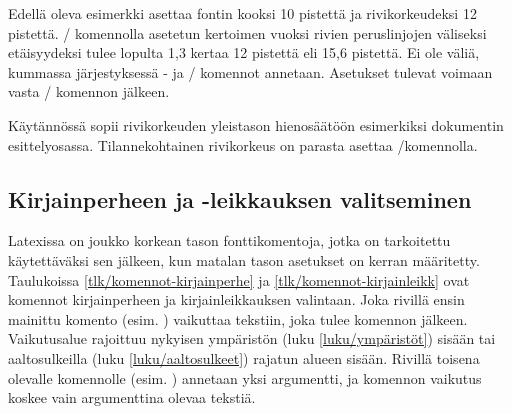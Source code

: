 \noindent
Edellä oleva esimerkki asettaa fontin kooksi 10 pistettä ja
rivikorkeudeksi 12 pistettä. \-/ komennolla asetetun
kertoimen vuoksi rivien peruslinjojen väliseksi etäisyydeksi tulee
lopulta 1,3 kertaa 12 pistettä eli 15,6 pistettä. Ei ole väliä, kummassa
järjestyksessä - ja \-/ komennot
annetaan. Asetukset tulevat voimaan vasta \-/
komennon jälkeen.

Käytännössä  sopii rivikorkeuden yleistason
hienosäätöön esimerkiksi dokumentin esittelyosassa. Tilannekohtainen
rivikorkeus on parasta asettaa \-/komennolla.

\subsection{Kirjainperheen ja -leikkauksen valitseminen}
\label{luku/fontit-korkea}

Latexissa on joukko korkean tason fonttikomentoja, jotka on tarkoitettu
käytettäväksi sen jälkeen, kun matalan tason asetukset on kerran
määritetty. Taulukoissa \ref{tlk/komennot-kirjainperhe} ja
\ref{tlk/komennot-kirjainleikk} ovat komennot kirjainperheen ja
kirjainleikkauksen valintaan. Joka rivillä ensin mainittu komento (esim.
) vaikuttaa tekstiin, joka tulee komennon jälkeen.
Vaikutusalue rajoittuu nykyisen ympäristön (luku \ref{luku/ympäristöt})
sisään tai aaltosulkeilla (luku \ref{luku/aaltosulkeet}) rajatun alueen
sisään. Rivillä toisena olevalle komennolle (esim. )
annetaan yksi argumentti, ja komennon vaikutus koskee vain argumenttina
olevaa tekstiä.


